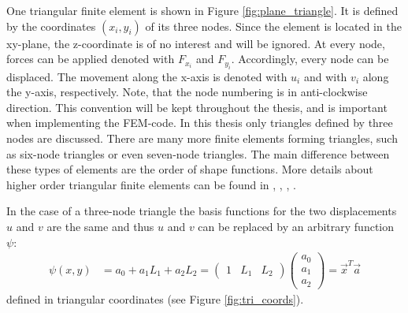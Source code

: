   One triangular finite element is shown in Figure \ref{fig:plane_triangle}. It is defined by the coordinates $(x_i,y_i)$ of its three nodes. Since the element is located in the xy-plane, the z-coordinate is of no interest and will be ignored. At every node, forces can be applied denoted with $F_{x_i}$ and $F_{y_i}$. Accordingly, every node can be displaced. The movement along the x-axis is denoted with $u_i$ and with $v_i$ along the y-axis, respectively. Note, that the node numbering is in anti-clockwise direction. This convention will be kept throughout the thesis, and is important when implementing the FEM-code.
  In this thesis only triangles defined by three nodes are discussed. There are many more finite elements forming triangles, such as six-node triangles or even seven-node triangles. The main difference between these types of elements are the order of shape functions. More details about higher order triangular finite elements can be found in \cite{zienkiewicz2000finite}, \cite{bergan1985triangular}, \cite{cook2002concepts}, \cite{braess2007finite}.
  
  In the case of a three-node triangle the basis functions for the two displacements $u$ and $v$ are the same and thus $u$ and $v$ can be replaced by an arbitrary function $\psi$\cite{steinke2005finite}:
  \begin{align}\label{eq:t3_ansatz}
  \psi(x,y) &= a_0 + a_1L_1 + a_2L_2 = \begin{pmatrix}
  1 & L_1 & L_2
  \end{pmatrix} \begin{pmatrix}
  a_0 \\ a_1 \\ a_2
  \end{pmatrix} = \vec{x}^T \vec{a}
  \end{align}
  defined in triangular coordinates (see Figure \ref{fig:tri_coords}).
  
